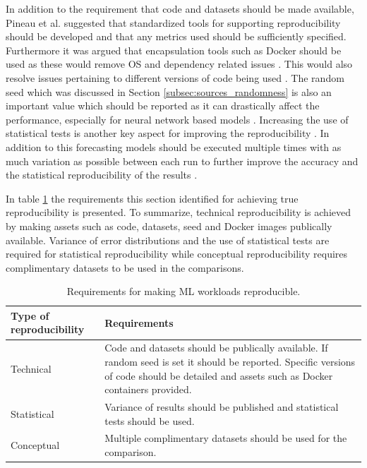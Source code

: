 In addition to the requirement that code and datasets should be made available, Pineau et al. suggested that standardized tools for supporting reproducibility should be developed and that any metrics used should be sufficiently specified. Furthermore it was argued that encapsulation tools such as Docker should be used as these would remove OS and dependency related issues \cite{pineau2020improving}. This would also resolve issues pertaining to different versions of code being used \cite{beam2020challenges}. The random seed which was discussed in Section \ref{subsec:sources_randomness} is also an important value which should be reported as it can drastically affect the performance, especially for neural network based models \cite{beam2020challenges, bouthillier2021accounting}. Increasing the use of statistical tests is another key aspect for improving the reproducibility \cite{mcdermott2019reproducibility}. In addition to this forecasting models should be executed multiple times with as much variation as possible between each run to further improve the accuracy and the statistical reproducibility of the results
\cite{bouthillier2021accounting}.

In table \ref{tab:reproducibility} the requirements this section identified for achieving true reproducibility is presented. To summarize, technical reproducibility is achieved by making assets such as code, datasets, seed and Docker images publically available. Variance of error distributions and the use of statistical tests are required for statistical reproducibility while conceptual reproducibility requires complimentary datasets to be used in the comparisons.

\begin{table}[h]
  \centering
  \begin{tabularx}{\textwidth}{|l|X|}
    \hline
    Type of reproducibility & Requirements                                                                                                                                                                               \\
    \hline
    \hline
    Technical               & Code and datasets should be publically available. If random seed is set it should be reported. Specific versions of code should be detailed and assets such as Docker containers provided. \\
    \hline
    Statistical             & Variance of results should be published and statistical tests should be used.                                                                                                              \\
    \hline
    Conceptual              & Multiple complimentary datasets should be used for the comparison.                                                                                                                         \\
    \hline
  \end{tabularx}
  \caption{Requirements for making ML workloads reproducible.}
  \label{tab:reproducibility}
\end{table}


